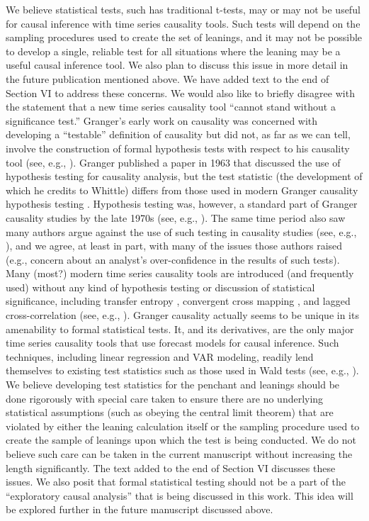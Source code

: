 \documentclass[a4paper,11pt]{article}
\begin{document}
We believe statistical tests, such has traditional t-tests, may or may not be useful for causal inference with time series causality tools.  Such tests will depend on the sampling procedures used to create the set of leanings, and it may not be possible to develop a single, reliable test for all situations where the leaning may be a useful causal inference tool.  We also plan to discuss this issue in more detail in the future publication mentioned above.  We have added text to the end of Section VI to address these concerns.  We would also like to briefly disagree with the statement that a new time series causality tool ``cannot stand without a significance test.''  Granger's early work on causality was concerned with developing a ``testable'' definition of causality but did not, as far as we can tell, involve the construction of formal hypothesis tests with respect to his causality tool (see, e.g., \cite{Granger1969}).  Granger published a paper in 1963 that discussed the use of hypothesis testing for causality analysis, but the test statistic (the development of which he credits to Whittle) differs from those used in modern Granger causality hypothesis testing \cite{Granger1963}.  Hypothesis testing was, however, a standard part of Granger causality studies by the late 1970s (see, e.g., \cite{Pierce1977}).  The same time period also saw many authors argue against the use of such testing in causality studies (see, e.g., \cite{Schwert1979,Jacobs1979}), and we agree, at least in part, with many of the issues those authors raised (e.g., concern about an analyst's over-confidence in the results of such tests).  Many (most?) modern time series causality tools are introduced (and frequently used) without any kind of hypothesis testing or discussion of statistical significance, including transfer entropy \cite{Schreiber2000}, convergent cross mapping \cite{Sugihara2012}, and lagged cross-correlation (see, e.g., \cite{Rogosa1980,Mcnames2007}).  Granger causality actually seems to be unique in its amenability to formal statistical tests.  It, and its derivatives, are the only major time series causality tools that use forecast models for causal inference.  Such techniques, including linear regression and VAR modeling, readily lend themselves to existing test statistics such as those used in Wald tests (see, e.g., \cite{Toda1994}).  We believe developing test statistics for the penchant and leanings should be done rigorously with special care taken to ensure there are no underlying statistical assumptions (such as obeying the central limit theorem) that are violated by either the leaning calculation itself or the sampling procedure used to create the sample of leanings upon which the test is being conducted.  We do not believe such care can be taken in the current manuscript without increasing the length significantly.  The text added to the end of Section VI discusses these issues.  We also posit that formal statistical testing should not be a part of the ``exploratory causal analysis'' that is being discussed in this work.  This idea will be explored further in the future manuscript discussed above.
\end{document}
